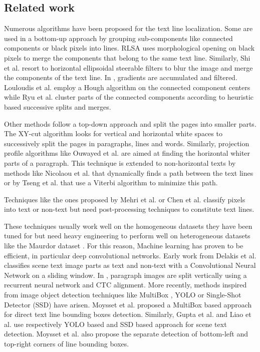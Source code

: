 \documentclass[conference]{IEEEtran}
\begin{document}
\subsection{Related work}
Numerous algorithms have been proposed for the text line localization. Some are used in a bottom-up approach by grouping sub-components like connected components or black pixels into lines. RLSA \cite{wong1982document} uses morphological opening on black pixels to merge the components that belong to the same text line. Similarly, Shi et al. \cite{Shi2009a} resort to horizontal ellipsoidal steerable filters to blur the image and merge the components of the text line. In \cite{WolfICPR2002V}, gradients are accumulated and filtered. Louloudis et al. \cite{Louloudis2009b} employ a Hough algorithm on the connected component centers while Ryu et al. \cite{ryu2014language} cluster parts of the connected components according to heuristic based successive splits and merges.

Other methods follow a top-down approach and split the pages into smaller parts. The XY-cut algorithm \cite{nagy1984hierarchical} looks for vertical and horizontal white spaces to successively split the pages in paragraphs, lines and words. Similarly, projection profile algorithms like Ouwayed et al. \cite{ouwayed2012general} are aimed at finding the horizontal whiter parts of a paragraph. This technique is extended to non-horizontal texts by methods like Nicolaou et al. \cite{Nicolaou2009} that dynamically finds a path between the text lines or by Tseng et al. \cite{tseng1999recognition} that use a Viterbi algorithm to minimize this path.

Techniques like the ones proposed by Mehri et al. \cite{mehri2013pixel} or Chen et al. \cite{chen2015page} classify pixels into text or non-text but need post-processing techniques to constitute text lines.

These techniques usually work well on the homogeneous datasets they have been tuned for but need heavy engineering to perform well on heterogeneous datasets like the Maurdor dataset \cite{Brunessaux2014}. For this reason, Machine learning has proven to be efficient, in particular deep convolutional networks. Early work from Delakis et al. \cite{delakis2008text} classifies scene text image parts as text and non-text with a Convolutional Neural Network on a sliding window. In \cite{moysset2015paragraph}, paragraph images are split vertically using a recurrent neural network and CTC alignment. More recently, methods inspired from image object detection techniques like MultiBox \cite{erhan2014scalable}, YOLO \cite{YOLOCVPR2016} or Single-Shot Detector (SSD) \cite{LiuErhanSSD2016} have arisen. Moysset et al. \cite{moysset2016learning} proposed a MultiBox based approach for direct text line bounding boxes detection. Similarly, Gupta et al. \cite{gupta2016synthetic} and Liao et al. \cite{liao2016textboxes} use respectively YOLO based and SSD based approach for scene text detection. Moysset et al. \cite{moysset2016points} also propose the separate detection of bottom-left and top-right corners of line bounding boxes.
\end{document}
